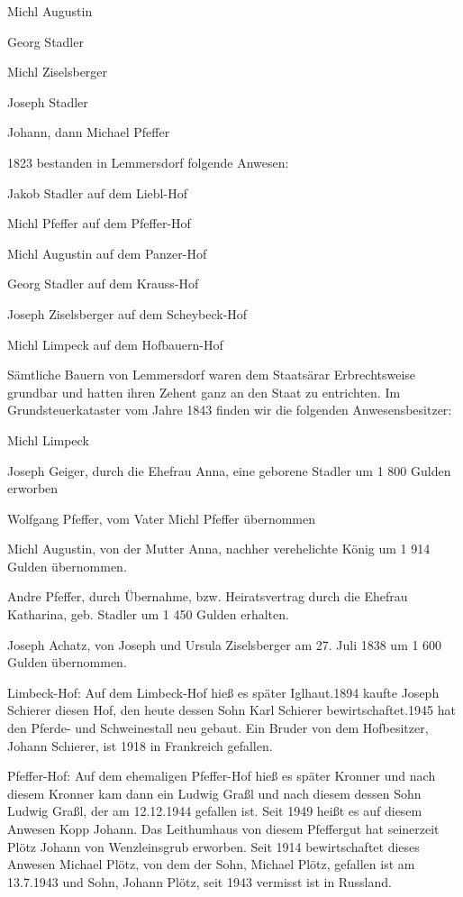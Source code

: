 \documentclass{book}
\begin{document}
Michl Augustin

Georg Stadler

Michl Ziselsberger

Joseph Stadler

Johann, dann Michael Pfeffer



1823 bestanden in Lemmersdorf folgende Anwesen:



Jakob Stadler auf dem Liebl-Hof

Michl Pfeffer auf dem Pfeffer-Hof

Michl Augustin auf dem Panzer-Hof

Georg Stadler auf dem Krauss-Hof

Joseph Ziselsberger auf dem Scheybeck-Hof

Michl Limpeck auf dem Hofbauern-Hof



Sämtliche Bauern von Lemmersdorf waren dem Staatsärar Erbrechtsweise grundbar
und hatten ihren Zehent ganz an den Staat zu entrichten. Im Grundsteuerkataster
vom Jahre 1843 finden wir die folgenden Anwesensbesitzer:



Michl Limpeck

Joseph Geiger, durch die Ehefrau Anna, eine geborene Stadler um 1 800 Gulden
erworben

Wolfgang Pfeffer, vom Vater Michl Pfeffer übernommen

Michl Augustin, von der Mutter Anna, nachher verehelichte König um 1 914 Gulden
übernommen.

Andre Pfeffer, durch Übernahme, bzw. Heiratsvertrag durch die Ehefrau Katharina,
geb. Stadler um 1 450 Gulden erhalten.

Joseph Achatz, von Joseph und Ursula Ziselsberger am 27. Juli 1838 um 1 600
Gulden übernommen.



Limbeck-Hof: Auf dem Limbeck-Hof hieß es später Iglhaut.1894 kaufte Joseph
Schierer diesen Hof, den heute dessen Sohn Karl Schierer bewirtschaftet.1945 hat
den Pferde- und Schweinestall neu gebaut. Ein Bruder von dem Hofbesitzer, Johann
Schierer, ist 1918 in Frankreich gefallen.

Pfeffer-Hof: Auf dem ehemaligen Pfeffer-Hof hieß es später Kronner und nach
diesem Kronner kam dann ein Ludwig Graßl und nach diesem dessen Sohn Ludwig
Graßl, der am 12.12.1944 gefallen ist. Seit 1949 heißt es auf diesem Anwesen
Kopp Johann. Das Leithumhaus von diesem Pfeffergut hat seinerzeit Plötz Johann
von Wenzleinsgrub erworben. Seit 1914 bewirtschaftet dieses Anwesen Michael
Plötz, von dem der Sohn, Michael Plötz, gefallen ist am 13.7.1943 und Sohn,
Johann Plötz, seit 1943 vermisst ist in Russland.
\end{document}
